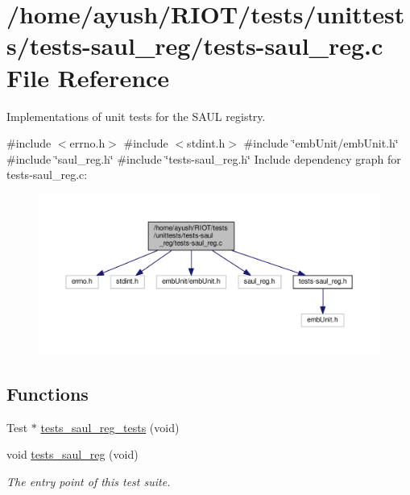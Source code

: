 \hypertarget{tests-saul__reg_8c}{}\section{/home/ayush/\+R\+I\+O\+T/tests/unittests/tests-\/saul\+\_\+reg/tests-\/saul\+\_\+reg.c File Reference}
\label{tests-saul__reg_8c}


Implementations of unit tests for the S\+A\+UL registry.  


{\ttfamily \#include $<$errno.\+h$>$}\newline
{\ttfamily \#include $<$stdint.\+h$>$}\newline
{\ttfamily \#include \char`\"{}emb\+Unit/emb\+Unit.\+h\char`\"{}}\newline
{\ttfamily \#include \char`\"{}saul\+\_\+reg.\+h\char`\"{}}\newline
{\ttfamily \#include \char`\"{}tests-\/saul\+\_\+reg.\+h\char`\"{}}\newline
Include dependency graph for tests-\/saul\+\_\+reg.c\+:
\nopagebreak
\begin{figure}[H]
\begin{center}
\leavevmode
\includegraphics[width=350pt]{tests-saul__reg_8c__incl}
\end{center}
\end{figure}
\subsection*{Functions}
\begin{DoxyCompactItemize}
\item 
Test $\ast$ \hyperlink{tests-saul__reg_8c_aa746168012175a7671e4e100b88de739}{tests\+\_\+saul\+\_\+reg\+\_\+tests} (void)
\item 
void \hyperlink{group__unittests_gaeae46a0be227b9113311165fc3b3752b}{tests\+\_\+saul\+\_\+reg} (void)
\begin{DoxyCompactList}\small\item\em The entry point of this test suite. \end{DoxyCompactList}\end{DoxyCompactItemize}


